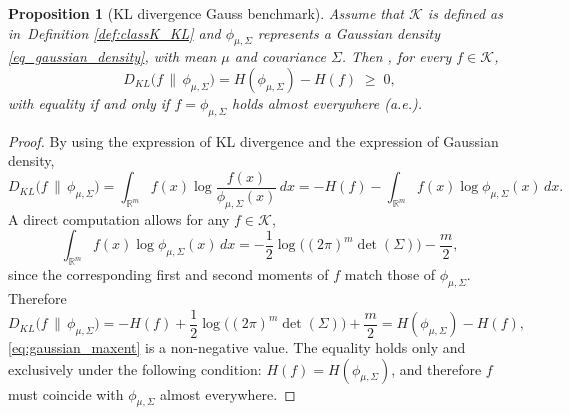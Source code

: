\documentclass[12pt,a4paper]{article}
\theoremstyle{definition}
\theoremstyle{plain}
\newtheorem{proposition}[theorem]{Proposition}
\begin{document}
\begin{proposition}[KL divergence Gauss benchmark]\label{prop:KL_maxent}
Assume that $\mathcal{K}$ is defined as in~{Definition} \ref{def:classK_KL} and
$\phi_{{\mu},{\Sigma}}$ represents a Gaussian density {\eqref{eq_gaussian_density}}, with mean ${\mu}$ and
covariance ${\Sigma}$. Then , for every $f \in \mathcal{K}$,
\begin{equation}\label{eq:KL_gaussian_representation}
D_{KL}\bigl(f \,\|\, \phi_{{\mu},{\Sigma}}\bigr)
= H(\phi_{{\mu},{\Sigma}}) - H(f)
\;\geq\; 0,
\end{equation}
with equality if and only if $f = \phi_{{\mu},{\Sigma}}$ holds almost everywhere (a.e.).
\end{proposition}

\begin{proof}
By using the expression of KL divergence and the expression of Gaussian density,
\[
D_{KL}\bigl(f \,\|\, \phi_{{\mu},{\Sigma}}\bigr)
= \int_{\mathbb{R}^m} f({x}) \log \frac{f({x})}{\phi_{{\mu},{\Sigma}}({x})}\,d{x}
= -H(f) - \int_{\mathbb{R}^m} f({x}) \log \phi_{{\mu},{\Sigma}}({x})\,d{x}.
\]
A direct computation allows for any $f \in \mathcal{K}$,
\[
\int_{\mathbb{R}^m} f({x}) \log \phi_{{\mu},{\Sigma}}({x})\,d{x}
= -\frac{1}{2}\log\bigl((2\pi)^m \det({\Sigma})\bigr) - \frac{m}{2},
\]
since the corresponding first and second moments of $f$ match those of $\phi_{{\mu},{\Sigma}}$.
Therefore
\[
D_{KL}\bigl(f \,\|\, \phi_{{\mu},{\Sigma}}\bigr)
= -H(f) + \frac{1}{2}\log\bigl((2\pi)^m \det({\Sigma})\bigr) + \frac{m}{2}
= H(\phi_{{\mu},{\Sigma}}) - H(f),
\]
\eqref{eq:gaussian_maxent} is a non-negative value. The equality holds only and exclusively under the following condition:
$H(f)=H(\phi_{{\mu},{\Sigma}})$, and therefore $f$ must coincide with
$\phi_{{\mu},{\Sigma}}$ { almost everywhere}.
\end{proof}
\end{document}
